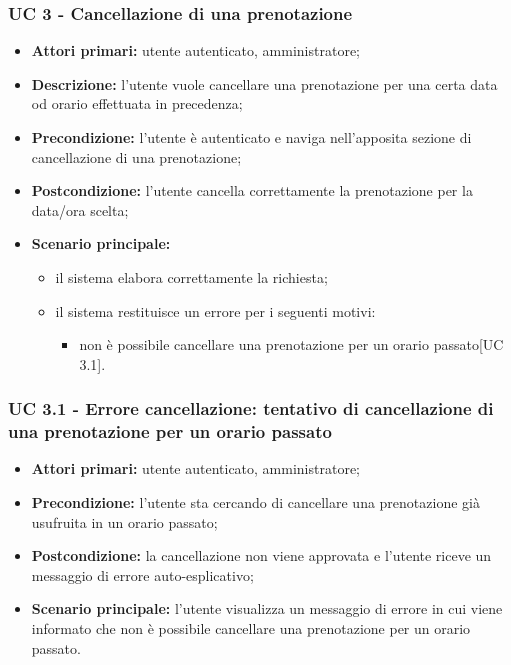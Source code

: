 \subsubsection{UC 3 - Cancellazione di una prenotazione}

\begin{itemize}
\item \textbf{Attori primari:} utente autenticato, amministratore;
\item \textbf{Descrizione:} l’utente vuole cancellare una prenotazione per una certa data od orario effettuata in precedenza;
\item \textbf{Precondizione:} l’utente è autenticato e naviga nell’apposita sezione di cancellazione di una prenotazione;
\item \textbf{Postcondizione:} l’utente cancella correttamente la prenotazione per la data/ora scelta;
\item \textbf{Scenario principale:} 
	\begin{itemize}
		\item il sistema elabora correttamente la richiesta;
		\item il sistema restituisce un errore per i seguenti motivi:
		\begin{itemize}
			\item non è possibile cancellare una prenotazione per un orario passato[UC 3.1].
		\end{itemize}
	\end{itemize}
\end{itemize}

\subsubsection{UC 3.1 - Errore cancellazione: tentativo di cancellazione di una prenotazione per un orario passato}
\begin{itemize}
\item \textbf{Attori primari:} utente autenticato, amministratore;
\item \textbf{Precondizione:} l'utente sta cercando di cancellare una prenotazione già usufruita in un orario passato;
\item \textbf{Postcondizione:} la cancellazione non viene approvata e l'utente riceve un messaggio di errore auto-esplicativo;
\item \textbf{Scenario principale:} l'utente visualizza un messaggio di errore in cui viene informato che non è possibile cancellare una prenotazione per un orario passato.
\end{itemize}

